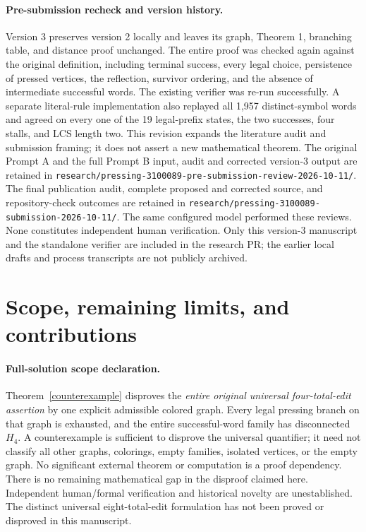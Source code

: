 \documentclass[11pt]{article}
\begin{document}
\paragraph{Pre-submission recheck and version history.}
Version 3 preserves version 2 locally and leaves its graph, Theorem 1, branching
table, and distance proof unchanged. The entire proof was checked again
against the original definition, including terminal success, every legal
choice, persistence of pressed vertices, the reflection, survivor ordering,
and the absence of intermediate successful words. The existing verifier
was re-run successfully. A separate literal-rule implementation also
replayed all 1,957 distinct-symbol words and agreed on every one of the
19 legal-prefix states, the two successes, four stalls, and LCS length two.
This revision expands the literature audit and submission framing;
it does not assert a new mathematical theorem.
The original Prompt A and the full Prompt B input, audit and corrected
version-3 output are retained in
\texttt{research/pressing-3100089-pre-submission-review-2026-10-11/}.
The final publication audit, complete proposed and corrected source, and
repository-check outcomes are retained in
\texttt{research/pressing-3100089-submission-2026-10-11/}.
The same configured model performed these reviews. None constitutes
independent human verification. Only this version-3 manuscript and the
standalone verifier are included in the research PR; the earlier local
drafts and process transcripts are not publicly archived.

\section{Scope, remaining limits, and contributions}
\paragraph{Full-solution scope declaration.}
Theorem~\ref{counterexample} disproves the \emph{entire original universal
four-total-edit assertion} by one explicit admissible colored graph.
Every legal pressing branch on that graph is exhausted, and the entire
successful-word family has disconnected $H_4$. A counterexample is
sufficient to disprove the universal quantifier; it need not classify
all other graphs, colorings, empty families, isolated vertices, or the
empty graph. No significant external theorem or computation is a proof
dependency. There is no remaining mathematical gap in the disproof claimed
here. Independent human/formal verification and historical novelty are
unestablished. The distinct universal eight-total-edit formulation has
not been proved or disproved in this manuscript.
\end{document}
